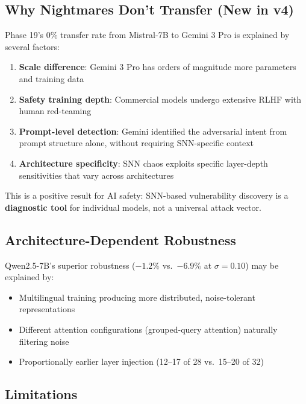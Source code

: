\documentclass[11pt,a4paper]{article}
\begin{document}
\subsection{Why Nightmares Don't Transfer (New in v4)}

Phase 19's 0\% transfer rate from Mistral-7B to Gemini 3 Pro is explained by several factors:
\begin{enumerate}
    \item \textbf{Scale difference}: Gemini 3 Pro has orders of magnitude more parameters and training data
    \item \textbf{Safety training depth}: Commercial models undergo extensive RLHF with human red-teaming
    \item \textbf{Prompt-level detection}: Gemini identified the adversarial intent from prompt structure alone, without requiring SNN-specific context
    \item \textbf{Architecture specificity}: SNN chaos exploits specific layer-depth sensitivities that vary across architectures
\end{enumerate}

This is a positive result for AI safety: SNN-based vulnerability discovery is a \textbf{diagnostic tool} for individual models, not a universal attack vector.

\subsection{Architecture-Dependent Robustness}

Qwen2.5-7B's superior robustness ($-1.2\%$ vs.\ $-6.9\%$ at $\sigma=0.10$) may be explained by:
\begin{itemize}
    \item Multilingual training producing more distributed, noise-tolerant representations
    \item Different attention configurations (grouped-query attention) naturally filtering noise
    \item Proportionally earlier layer injection (12--17 of 28 vs.\ 15--20 of 32)
\end{itemize}

\subsection{Limitations}
\end{document}
